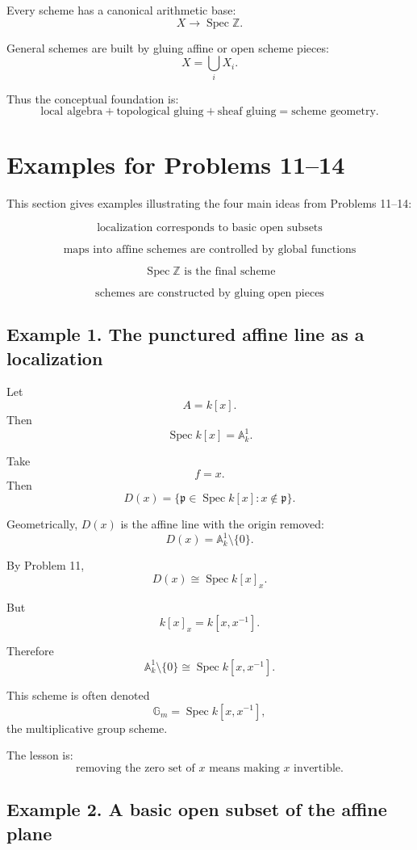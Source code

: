 \documentclass[12pt,a4paper]{article}
\newcommand{\ZZ}{\mathbb Z}
\newcommand{\Spec}{\operatorname{Spec}}
\theoremstyle{notespace}
\begin{document}
Every scheme has a canonical arithmetic base:
\[
X\to\Spec\ZZ.
\]

General schemes are built by gluing affine or open scheme pieces:
\[
X=\bigcup_i X_i.
\]

Thus the conceptual foundation is:
\[
\boxed{
	\text{local algebra}
	+
	\text{topological gluing}
	+
	\text{sheaf gluing}
	=
	\text{scheme geometry}.
}
\]

\section{Examples for Problems 11--14}

This section gives examples illustrating the four main ideas from Problems 11--14:

\[
\boxed{
	\text{localization corresponds to basic open subsets}
}
\]

\[
\boxed{
	\text{maps into affine schemes are controlled by global functions}
}
\]

\[
\boxed{
	\Spec\mathbb Z \text{ is the final scheme}
}
\]

\[
\boxed{
	\text{schemes are constructed by gluing open pieces}
}
\]

\subsection{Example 1. The punctured affine line as a localization}

Let
\[
A=k[x].
\]
Then
\[
\Spec k[x]=\mathbb A^1_k.
\]

Take
\[
f=x.
\]
Then
\[
D(x)=\{\mathfrak p\in \Spec k[x]:x\notin\mathfrak p\}.
\]

Geometrically, \(D(x)\) is the affine line with the origin removed:
\[
D(x)=\mathbb A^1_k\setminus\{0\}.
\]

By Problem 11,
\[
D(x)\cong \Spec k[x]_x.
\]

But
\[
k[x]_x=k[x,x^{-1}].
\]

Therefore
\[
\boxed{
	\mathbb A^1_k\setminus\{0\}
	\cong
	\Spec k[x,x^{-1}].
}
\]

This scheme is often denoted
\[
\mathbb G_m=\Spec k[x,x^{-1}],
\]
the multiplicative group scheme.

The lesson is:
\[
\boxed{
	\text{removing the zero set of }x
	\text{ means making }x\text{ invertible.}
}
\]

\subsection{Example 2. A basic open subset of the affine plane}
\end{document}
